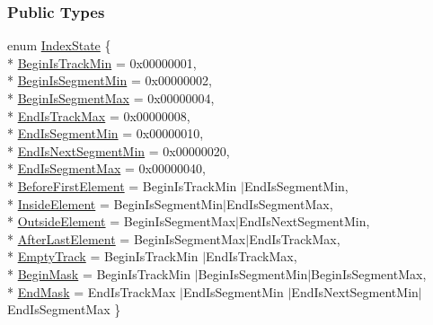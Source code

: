 \subsubsection*{Public Types}
\begin{DoxyCompactItemize}
\item 
enum \hyperlink{classKite_1_1Track_af4bdc8469c0fee386fc2ff30e0666bca}{Index\-State} \{ \\*
\hyperlink{classKite_1_1Track_af4bdc8469c0fee386fc2ff30e0666bcaa8b61f6a736a067f2124ee5bd5cb8ac71}{Begin\-Is\-Track\-Min} = 0x00000001, 
\\*
\hyperlink{classKite_1_1Track_af4bdc8469c0fee386fc2ff30e0666bcaa2558894ee6c661f4c13276cc8f2464a4}{Begin\-Is\-Segment\-Min} = 0x00000002, 
\\*
\hyperlink{classKite_1_1Track_af4bdc8469c0fee386fc2ff30e0666bcaa8b6241764173838bf07e69fb78b688a4}{Begin\-Is\-Segment\-Max} = 0x00000004, 
\\*
\hyperlink{classKite_1_1Track_af4bdc8469c0fee386fc2ff30e0666bcaa405dc0d4b2391506d0dcc4a75d5f1ba2}{End\-Is\-Track\-Max} = 0x00000008, 
\\*
\hyperlink{classKite_1_1Track_af4bdc8469c0fee386fc2ff30e0666bcaa24e6a845af9d42451a2c41f2f8d388d1}{End\-Is\-Segment\-Min} = 0x00000010, 
\\*
\hyperlink{classKite_1_1Track_af4bdc8469c0fee386fc2ff30e0666bcaa03aebc159f233b883124bd19fdd2ea0f}{End\-Is\-Next\-Segment\-Min} = 0x00000020, 
\\*
\hyperlink{classKite_1_1Track_af4bdc8469c0fee386fc2ff30e0666bcaab507ecf157f576817fafc5e7deb71629}{End\-Is\-Segment\-Max} = 0x00000040, 
\\*
\hyperlink{classKite_1_1Track_af4bdc8469c0fee386fc2ff30e0666bcaa5c7f72d6942ae38d66f530bea1063adf}{Before\-First\-Element} = Begin\-Is\-Track\-Min $|$\-End\-Is\-Segment\-Min, 
\\*
\hyperlink{classKite_1_1Track_af4bdc8469c0fee386fc2ff30e0666bcaa36e625d718c74f5ff503638360ba1166}{Inside\-Element} = Begin\-Is\-Segment\-Min$|$\-End\-Is\-Segment\-Max, 
\\*
\hyperlink{classKite_1_1Track_af4bdc8469c0fee386fc2ff30e0666bcaa55d08f66f21334eb8c0dca170f1cb8a4}{Outside\-Element} = Begin\-Is\-Segment\-Max$|$\-End\-Is\-Next\-Segment\-Min, 
\\*
\hyperlink{classKite_1_1Track_af4bdc8469c0fee386fc2ff30e0666bcaa3fc579452c9779cd2865d5019a61c6a5}{After\-Last\-Element} = Begin\-Is\-Segment\-Max$|$\-End\-Is\-Track\-Max, 
\\*
\hyperlink{classKite_1_1Track_af4bdc8469c0fee386fc2ff30e0666bcaaa697b71e325cea0980e9555654f8f3cf}{Empty\-Track} = Begin\-Is\-Track\-Min $|$\-End\-Is\-Track\-Max, 
\\*
\hyperlink{classKite_1_1Track_af4bdc8469c0fee386fc2ff30e0666bcaa8621fa6a5b7a491fd1bf8dd7f0dd3589}{Begin\-Mask} = Begin\-Is\-Track\-Min $|$\-Begin\-Is\-Segment\-Min$|$\-Begin\-Is\-Segment\-Max, 
\\*
\hyperlink{classKite_1_1Track_af4bdc8469c0fee386fc2ff30e0666bcaa0b5a81972d3a6718c3d68199467d2d11}{End\-Mask} = End\-Is\-Track\-Max $|$\-End\-Is\-Segment\-Min $|$\-End\-Is\-Next\-Segment\-Min$|$\-End\-Is\-Segment\-Max
 \}
\end{DoxyCompactItemize}
